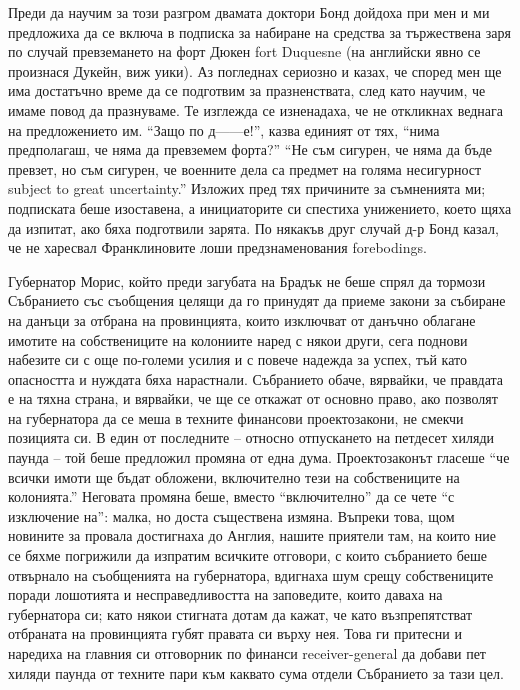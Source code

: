 \documentclass[12pt]{book}
\begin{document}
Преди да научим за този разгром двамата доктори Бонд дойдоха при мен и ми предложиха да се включа в подписка за набиране на средства за тържествена заря по случай превземането на форт Дюкен fort Duquesne (на английски явно се произнася Дукейн, виж уики). Аз погледнах сериозно и казах, че според мен ще има достатъчно време да се подготвим за празненствата, след като научим, че имаме повод да празнуваме. Те изглежда се изненадаха, че не откликнах веднага на предложението им. “Защо по д------е!”, казва единият от тях, “нима предполагаш, че няма да превземем форта?” “Не съм сигурен, че няма да бъде превзет, но съм сигурен, че военните дела са предмет на голяма несигурност subject to great uncertainty.” Изложих пред тях причините за съмненията ми; подписката беше изоставена, а инициаторите си спестиха унижението, което щяха да изпитат, ако бяха подготвили зарята. По някакъв друг случай д-р Бонд казал, че не харесвал Франклиновите лоши предзнаменования forebodings. 

Губернатор Морис, който преди загубата на Брадък не беше спрял да тормози Събранието със съобщения целящи да го принудят да приеме закони за събиране на данъци за отбрана на провинцията, които изключват от данъчно облагане имотите на собствениците на колониите наред с някои други, сега поднови набезите си с още по-големи усилия и с повече надежда за успех, тъй като опасността и нуждата бяха нарастнали. Събранието обаче, вярвайки, че правдата е на тяхна страна, и вярвайки, че ще се откажат от основно право, ако позволят на губернатора да се меша в техните финансови проектозакони, не смекчи позицията си. В един от последните – относно отпускането на петдесет хиляди паунда – той беше предложил промяна от една дума. Проектозаконът гласеше “че всички имоти ще бъдат обложени, включително тези на собствениците на колонията.” Неговата промяна беше, вместо “включително” да се чете “с изключение на”: малка, но доста съществена измяна. Въпреки това, щом новините за провала достигнаха до Англия, нашите приятели там, на които ние се бяхме погрижили да изпратим всичките отговори, с които събранието беше отвърнало на съобщенията на губернатора, вдигнаха шум срещу собствениците поради лошотията и несправедливостта на заповедите, които даваха на губернатора си; като някои стигната дотам да кажат, че като възпрепятстват отбраната на провинцията губят правата си върху нея. Това ги притесни и наредиха на главния си отговорник по финанси receiver-general да добави пет хиляди паунда от техните пари към каквато сума отдели Събранието за тази цел.
\end{document}
